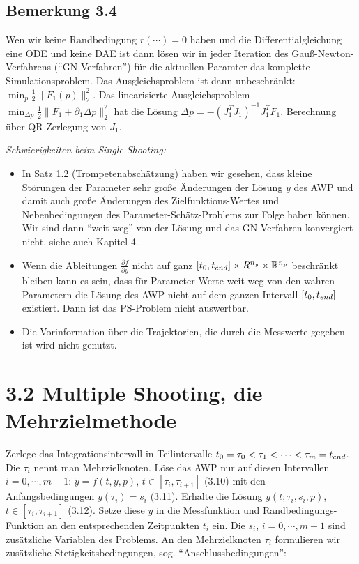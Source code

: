 \subsection*{Bemerkung 3.4}

Wen wir keine Randbedingung $r(\cdots)=0$ haben und die Differentialgleichung eine ODE und keine DAE ist dann lösen wir in jeder Iteration des Gauß-Newton-Verfahrens ("`GN-Verfahren"') für die aktuellen Paramter das komplette Simulationsproblem. Das Ausgleichsproblem ist dann unbeschränkt: $\min_p \tfrac 12 \|F_1(p)\|_2^2$. Das linearisierte Ausgleichsproblem $\min_{\Delta p} \tfrac 12 \|F_1 + \partial_1 \Delta p\|_2^2$ hat die Lösung $\Delta p = -(J_1^T J_1)^{-1} J_1^T F_1$. Berechnung über QR-Zerlegung von $J_1$.

\emph{Schwierigkeiten beim Single-Shooting:}

\begin{itemize}
\item In Satz 1.2 (Trompetenabschätzung) haben wir gesehen, dass kleine Störungen der Parameter sehr große Änderungen der Lösung $y$ des AWP und damit auch große Änderungen des Zielfunktions-Wertes und Nebenbedingungen des Parameter-Schätz-Problems zur Folge haben können. Wir sind dann "`weit weg"' von der Lösung und das GN-Verfahren konvergiert nicht, siehe auch Kapitel 4.
\item Wenn die Ableitungen $\tfrac{\partial f}{\partial y}$ nicht auf ganz $[t_0,t_{end}]\times R^{n_y} \times \mathbb{R}^{n_p}$  beschränkt bleiben kann es sein, dass für Parameter-Werte weit weg von den wahren Parametern die Lösung des AWP nicht auf dem ganzen Intervall $[t_0,t_{end}]$ existiert. Dann  ist das PS-Problem nicht auswertbar.
\item Die Vorinformation über die Trajektorien, die durch die Messwerte gegeben ist wird nicht genutzt.
\end{itemize}

\section*{3.2 Multiple Shooting, die Mehrzielmethode}

Zerlege das Integrationsintervall in Teilintervalle $t_0 = \tau_0 < \tau_1 < \cdots < \tau_m = t_{end}$. Die $\tau_i$ nennt man Mehrzielknoten. Löse das AWP nur auf diesen Intervallen $i=0,\cdots,m-1$: $\dot y = f(t,y,p)$, $t \in [\tau_i, \tau_{i+1} ]$ (3.10) mit den Anfangsbedingungen $y(\tau_i) = s_i$ (3.11). Erhalte die Lösung $y(t; \tau_i, s_i,p)$, $t\in[\tau_i, \tau_{i+1}]$ (3.12). Setze diese $y$ in die Messfunktion und Randbedingungs-Funktion an den entsprechenden Zeitpunkten $t_i$ ein. Die $s_i$, $i=0,\cdots,m-1$ sind zusätzliche Variablen des Problems. An den Mehrzielknoten $\tau_i$ formulieren wir zusätzliche  Stetigkeitsbedingungen, sog. "`Anschlussbedingungen"':

